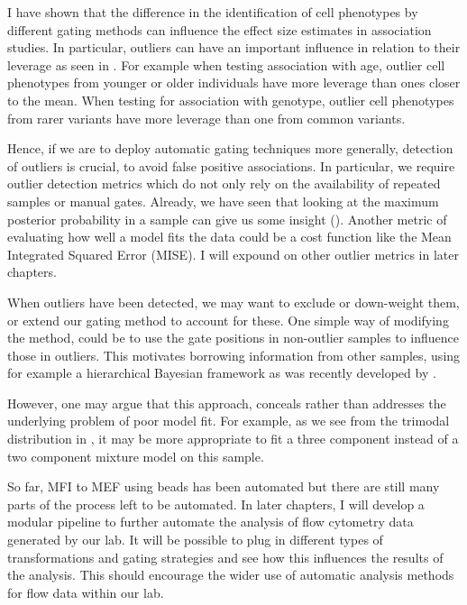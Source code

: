 I have shown that the difference in the identification of cell phenotypes by different gating methods can influence the effect size estimates in association studies.
In particular, outliers can have an important influence in relation to their leverage as seen in .
For example when testing association with age, outlier cell phenotypes from younger or older individuals have more leverage than ones closer to the mean.
When testing for association with genotype, outlier cell phenotypes from rarer variants have more leverage than one from common variants.

Hence, if we are to deploy automatic gating techniques more generally, detection of outliers is crucial, to avoid false positive associations.
In particular, we require outlier detection metrics which do not only rely on the availability of repeated samples or manual gates.
Already, we have seen that looking at the maximum posterior probability in a sample can give us some insight ().
Another metric of evaluating how well a model fits the data could be a cost function like the Mean Integrated Squared Error (MISE).
I will expound on other outlier metrics in later chapters.

When outliers have been detected, we may want to exclude or down-weight them, or extend our gating method to account for these.
One simple way of modifying the method, could be to use the gate positions in non-outlier samples to influence those in outliers.
This motivates borrowing information from other samples, using for example a hierarchical Bayesian framework as was recently developed by \citet{Cron:2013dh}.

However, one may argue that this approach, conceals rather than addresses the underlying problem of poor model fit.
For example, as we see from the trimodal distribution in ,
it may be more appropriate to fit a three component instead of a two component mixture model on this sample.

So far, MFI to MEF using beads has been automated but there are still many parts of the process left to be automated.
In later chapters, I will develop a modular pipeline to further automate the analysis of flow cytometry data generated by our lab.
It will be possible to plug in different types of transformations and gating strategies and see how this influences
the results of the analysis.
This should encourage the wider use of automatic analysis methods for flow data within our lab.

